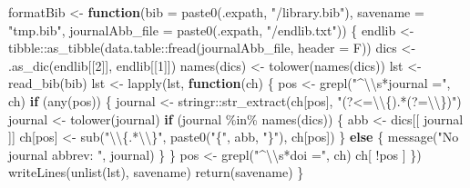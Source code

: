 \documentclass[
]{article}
\newenvironment{Shaded}{\begin{snugshade}}{\end{snugshade}}
\newcommand{\AttributeTok}[1]{\textcolor[rgb]{0.77,0.63,0.00}{#1}}
\newcommand{\ControlFlowTok}[1]{\textcolor[rgb]{0.13,0.29,0.53}{\textbf{#1}}}
\newcommand{\DecValTok}[1]{\textcolor[rgb]{0.00,0.00,0.81}{#1}}
\newcommand{\FunctionTok}[1]{\textcolor[rgb]{0.00,0.00,0.00}{#1}}
\newcommand{\NormalTok}[1]{#1}
\newcommand{\OtherTok}[1]{\textcolor[rgb]{0.56,0.35,0.01}{#1}}
\newcommand{\SpecialCharTok}[1]{\textcolor[rgb]{0.00,0.00,0.00}{#1}}
\newcommand{\StringTok}[1]{\textcolor[rgb]{0.31,0.60,0.02}{#1}}
\begin{document}
\begin{Shaded}
\begin{Highlighting}[]
\NormalTok{formatBib }\OtherTok{\textless{}{-}} \ControlFlowTok{function}\NormalTok{(}\AttributeTok{bib =} \FunctionTok{paste0}\NormalTok{(.expath, }\StringTok{"/library.bib"}\NormalTok{), }\AttributeTok{savename =} \StringTok{"tmp.bib"}\NormalTok{, }
  \AttributeTok{journalAbb\_file =} \FunctionTok{paste0}\NormalTok{(.expath, }\StringTok{"/endlib.txt"}\NormalTok{))}
\NormalTok{\{}
\NormalTok{  endlib }\OtherTok{\textless{}{-}}\NormalTok{ tibble}\SpecialCharTok{::}\FunctionTok{as\_tibble}\NormalTok{(data.table}\SpecialCharTok{::}\FunctionTok{fread}\NormalTok{(journalAbb\_file, }\AttributeTok{header =}\NormalTok{ F))}
\NormalTok{  dics }\OtherTok{\textless{}{-}} \FunctionTok{.as\_dic}\NormalTok{(endlib[[}\DecValTok{2}\NormalTok{]], endlib[[}\DecValTok{1}\NormalTok{]])}
  \FunctionTok{names}\NormalTok{(dics) }\OtherTok{\textless{}{-}} \FunctionTok{tolower}\NormalTok{(}\FunctionTok{names}\NormalTok{(dics))}
\NormalTok{  lst }\OtherTok{\textless{}{-}} \FunctionTok{read\_bib}\NormalTok{(bib)}
\NormalTok{  lst }\OtherTok{\textless{}{-}} \FunctionTok{lapply}\NormalTok{(lst,}
    \ControlFlowTok{function}\NormalTok{(ch) \{}
\NormalTok{      pos }\OtherTok{\textless{}{-}} \FunctionTok{grepl}\NormalTok{(}\StringTok{"\^{}}\SpecialCharTok{\textbackslash{}\textbackslash{}}\StringTok{s*journal ="}\NormalTok{, ch)}
      \ControlFlowTok{if}\NormalTok{ (}\FunctionTok{any}\NormalTok{(pos)) \{}
\NormalTok{        journal }\OtherTok{\textless{}{-}}\NormalTok{ stringr}\SpecialCharTok{::}\FunctionTok{str\_extract}\NormalTok{(ch[pos], }\StringTok{"(?\textless{}=}\SpecialCharTok{\textbackslash{}\textbackslash{}}\StringTok{\{).*(?=}\SpecialCharTok{\textbackslash{}\textbackslash{}}\StringTok{\})"}\NormalTok{)}
\NormalTok{        journal }\OtherTok{\textless{}{-}} \FunctionTok{tolower}\NormalTok{(journal)}
        \ControlFlowTok{if}\NormalTok{ (journal }\SpecialCharTok{\%in\%} \FunctionTok{names}\NormalTok{(dics)) \{}
\NormalTok{          abb }\OtherTok{\textless{}{-}}\NormalTok{ dics[[ journal ]]}
\NormalTok{          ch[pos] }\OtherTok{\textless{}{-}} \FunctionTok{sub}\NormalTok{(}\StringTok{"}\SpecialCharTok{\textbackslash{}\textbackslash{}}\StringTok{\{.*}\SpecialCharTok{\textbackslash{}\textbackslash{}}\StringTok{\}"}\NormalTok{, }\FunctionTok{paste0}\NormalTok{(}\StringTok{"\{"}\NormalTok{, abb, }\StringTok{"\}"}\NormalTok{), ch[pos])}
\NormalTok{        \} }\ControlFlowTok{else}\NormalTok{ \{}
          \FunctionTok{message}\NormalTok{(}\StringTok{"No journal abbrev: "}\NormalTok{, journal)}
\NormalTok{        \}}
\NormalTok{      \}}
\NormalTok{      pos }\OtherTok{\textless{}{-}} \FunctionTok{grepl}\NormalTok{(}\StringTok{"\^{}}\SpecialCharTok{\textbackslash{}\textbackslash{}}\StringTok{s*doi ="}\NormalTok{, ch)}
\NormalTok{      ch[ }\SpecialCharTok{!}\NormalTok{pos ]}
\NormalTok{    \})}
  \FunctionTok{writeLines}\NormalTok{(}\FunctionTok{unlist}\NormalTok{(lst), savename)}
  \FunctionTok{return}\NormalTok{(savename)}
\NormalTok{\}}
\end{Highlighting}
\end{Shaded}
\end{document}
